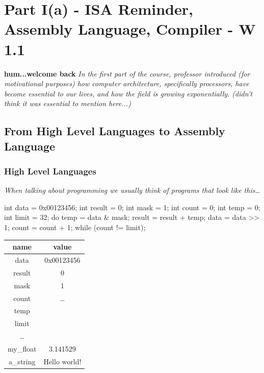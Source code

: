 \chapter{Part I(a) - ISA Reminder, Assembly Language, Compiler - W 1.1}
\textbf{hum...welcome back} \newline
\textit{In the first part of the course, professor introduced (for motivational purposes) how computer architecture, specifically processors, have become essential to our lives, and how the field is growing exponentially. (didn't think it was essential to mention here...)}

\section{From High Level Languages to Assembly Language}
\subsection{High Level Languages}
\textit{When talking about programming we usually think of programs that look like this\dots} \newline \vspace*{5px}

\begin{minipage}[htp]{0.4\textwidth} %
\begin{cc}
int data = 0x00123456;
int result = 0;
int mask = 1;
int count = 0;
int temp = 0;
int limit = 32;
do {
    temp = data & mask;
    result = result + temp;
    data = data >> 1;
    count = count + 1;
} while (count != limit);
\end{cc}
\end{minipage}
\hfill
\vline
\hfill
\begin{minipage}[htp]{0.4\textwidth}
    \centering
    \begin{tabular}{|c|c|}
        \hline
        \textbf{name} & \textbf{value} \\ \hline
        data       & 0x00123456  \\ \hline
        result     & 0           \\ \hline
        mask       & 1           \\ \hline
        count      & \dots       \\ \hline
        temp       &             \\ \hline
        limit      &             \\ \hline
        \dots      &             \\ \hline
        my\_float  & 3.141529    \\ \hline
        a\_string  & Hello world! \\ \hline
        \end{tabular}
\end{minipage}

